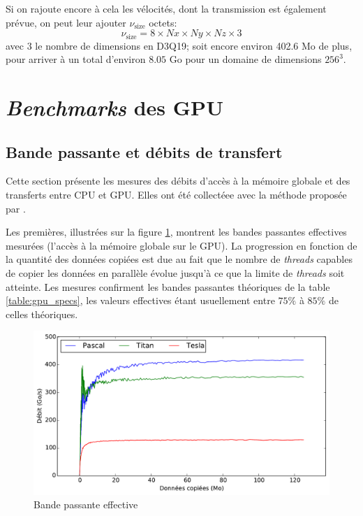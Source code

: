 Si on rajoute encore à cela les vélocités, dont la transmission est également prévue, on peut leur ajouter $\nu_\mathrm{size}$ octets:
\begin{equation}
\nu_\mathrm{size} = 8 \times Nx \times Ny \times Nz \times 3
\end{equation}
avec $3$ le nombre de dimensions en D3Q19; soit encore environ 402.6 Mo de plus, pour arriver à un total d'environ $8.05$ Go pour un domaine de dimensions $256^3$.

\section{\textit{Benchmarks} des \acs{GPU}} \label{title-benchmark_gpu}

\subsection{Bande passante et débits de transfert}
Cette section présente les mesures des débits d'accès à la mémoire globale et des transferts entre \acs{CPU} et \acs{GPU}. Elles ont été collectéee avec la méthode proposée par \citet{ZZZweb_how_2012}.

Les premières, illustrées sur la figure \ref{fig:bandwidth}, montrent les bandes passantes effectives mesurées (l'accès à la mémoire globale sur le \acs{GPU}). La progression en fonction de la quantité des données copiées est due au fait que le nombre de \textit{threads} capables de copier les données en parallèle évolue jusqu'à ce que la limite de \textit{threads} soit atteinte. Les mesures confirment les bandes passantes théoriques de la table \ref{table:gpu_specs}, les valeurs effectives étant usuellement entre $75\%$ à $85\%$ de celles théoriques.

\begin{figure}[h]
	\centering
	\includegraphics[fbox, scale=0.61]{images/perfs/throughput/bandwidth.pdf}
	\caption{Bande passante effective}
	\label{fig:bandwidth}
\end{figure}

